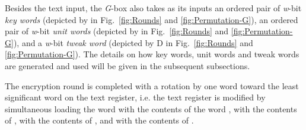 \documentclass[a4paper,oneside,english]{amsart}
\numberwithin{equation}{section}
\numberwithin{figure}{section}
\begin{document}
Besides the text input, the \emph{G}-box also takes as its inputs
an ordered pair of \emph{w}-bit \emph{key words} 
(depicted by  in Fig.~\ref{fig:Rounds} and \ref{fig:Permutation-G}),
an ordered pair of \emph{w}-bit \emph{unit words} 
(depicted by  in Fig.~\ref{fig:Rounds} and \ref{fig:Permutation-G}),
and a \emph{w}-bit \emph{tweak word}  (depicted by \textsf{\scriptsize D}
in Fig.~\ref{fig:Rounds} and \ref{fig:Permutation-G}). The details
on how key words, unit words and tweak words are generated and used
will be given in the subsequent subsections.

The encryption round is completed with a rotation by one word toward
the least significant word on the text register, i.e. the text register
is modified by simultaneous loading the word  with the contents
of the word ,  with the contents of , 
with the contents of , and  with the contents of .
\end{document}

